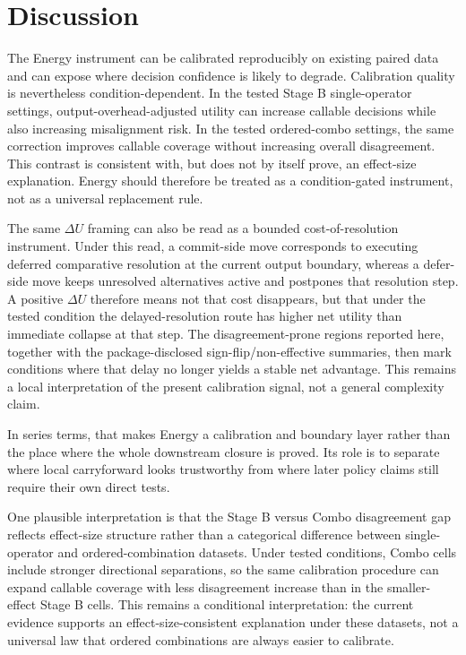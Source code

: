 \documentclass[11pt,a4paper]{article}
\begin{document}
\section{Discussion}
\label{sec:discussion}

The Energy instrument can be calibrated reproducibly on existing paired data and can expose where decision confidence is likely to degrade. Calibration quality is nevertheless condition-dependent. In the tested Stage B single-operator settings, output-overhead-adjusted utility can increase callable decisions while also increasing misalignment risk. In the tested ordered-combo settings, the same correction improves callable coverage without increasing overall disagreement. This contrast is consistent with, but does not by itself prove, an effect-size explanation. Energy should therefore be treated as a condition-gated instrument, not as a universal replacement rule.

The same $\Delta U$ framing can also be read as a bounded cost-of-resolution instrument. Under this read, a commit-side move corresponds to executing deferred comparative resolution at the current output boundary, whereas a defer-side move keeps unresolved alternatives active and postpones that resolution step. A positive $\Delta U$ therefore means not that cost disappears, but that under the tested condition the delayed-resolution route has higher net utility than immediate collapse at that step. The disagreement-prone regions reported here, together with the package-disclosed sign-flip/non-effective summaries, then mark conditions where that delay no longer yields a stable net advantage. This remains a local interpretation of the present calibration signal, not a general complexity claim.

In series terms, that makes Energy a calibration and boundary layer rather than the
place where the whole downstream closure is proved. Its role is to separate where
local carryforward looks trustworthy from where later policy claims still require
their own direct tests.

One plausible interpretation is that the Stage B versus Combo disagreement gap reflects effect-size structure rather than a categorical difference between single-operator and ordered-combination datasets. Under tested conditions, Combo cells include stronger directional separations, so the same calibration procedure can expand callable coverage with less disagreement increase than in the smaller-effect Stage B cells. This remains a conditional interpretation: the current evidence supports an effect-size-consistent explanation under these datasets, not a universal law that ordered combinations are always easier to calibrate.
\end{document}
